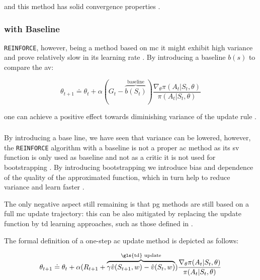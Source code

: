 \documentclass[draft=false]{seal_thesis}
\begin{document}
and this method has solid convergence properties \citep[p. 271]{Sutton2017}.

\subsubsection{ with Baseline}

\texttt{REINFORCE}, however, being a method based on \gls{mc} it might exhibit high variance and prove relatively slow in its learning rate \citep[p. 271]{Sutton2017}. By introducing a baseline $b(s)$ to compare the \gls{av}:

\begin{equation}
	\theta_{t+1} \doteq \theta_t + \alpha (G_t - \overbrace{b(S_t)}^{\text{baseline}}) \frac{\nabla_\theta \pi(A_t|S_t,\theta)}{\pi(A_t|S_t,\theta)}
\end{equation}

one can achieve a positive effect towards diminishing variance of the update rule \citep[p. 271]{Sutton2017}.

\subsubsection{ }

By introducing a base line, we have seen that variance can be lowered, however, the \texttt{REINFORCE} algorithm with a baseline is not a proper \gls{ac} method as its \gls{sv} function is only used as baseline and not as a critic \ie it is not used for bootstrapping \citep[p. 273]{Sutton2017}. By introducing bootstrapping we introduce bias and dependence of the quality of the approximated function, which in turn help to reduce variance and learn faster \citep[p. 273]{Sutton2017}. 

The only negative aspect still remaining is that \gls{pg} methods are still based on a full \gls{mc} update trajectory: this can be also mitigated by replacing the update function by \gls{td} learning approaches, such as those defined in  \citep[p. 273]{Sutton2017}.

The formal definition of a one-step \gls{ac} update method is depicted as follows:

\begin{equation}
	\theta_{t+1} \doteq \theta_t + \alpha(R_{t+1} + \overbrace{\gamma \hat{v}(S_{t+1},w)-\hat{v}(S_t,w)}^{\text{\gls{td} update}}) \frac{\nabla_\theta \pi(A_t|S_t,\theta)}{\pi(A_t|S_t,\theta)}
\end{equation}
\end{document}
